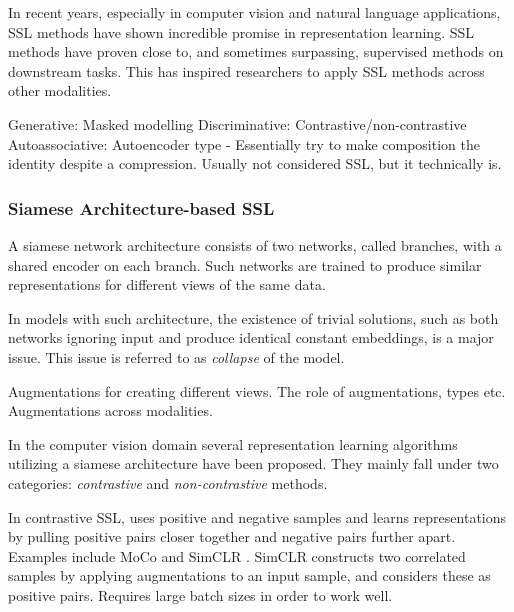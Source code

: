 \documentclass[../../thesis.tex]{subfiles}
\begin{document}
In recent years, especially in computer vision and natural language applications, SSL methods have shown incredible promise in representation learning. SSL methods have proven close to, and sometimes surpassing, supervised methods on downstream tasks. This has inspired researchers to apply SSL methods across other modalities. 


Generative: Masked modelling 
Discriminative: Contrastive/non-contrastive
Autoassociative: Autoencoder type - Essentially try to make composition the identity despite a compression. Usually not considered SSL, but it technically is. 

\subsubsection{Siamese Architecture-based SSL }
\cite{lee2024computer}
A siamese network architecture \cite{siamese} consists of two networks, called branches, with a shared encoder on each branch. Such networks are trained to produce similar representations for different views of the same data. \newline

In models with such architecture, the existence of trivial solutions, such as both networks ignoring input and produce identical constant embeddings, is a major issue. This issue is referred to as \textit{collapse} of the model.\newline

Augmentations for creating different views. The role of augmentations, types etc. Augmentations across modalities. \cite{morningstar2024augmentations} \newline


In the computer vision domain several representation learning algorithms utilizing a siamese architecture have been proposed. They mainly fall under two categories: \textit{contrastive} and \textit{non-contrastive} methods.\newline

In contrastive SSL, uses positive and negative samples and learns representations by pulling positive pairs closer together and negative pairs further apart. Examples include MoCo \cite{he2020momentum} and SimCLR \cite{chen2020simple}. SimCLR constructs two correlated samples by applying augmentations to an input sample, and considers these as positive pairs. Requires large batch sizes in order to work well.
\end{document}
